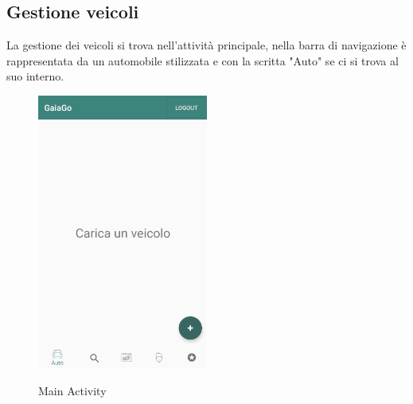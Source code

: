 \subsection{Gestione veicoli}
La gestione dei veicoli si trova nell'attività principale, nella barra di navigazione è rappresentata da un automobile stilizzata e con la scritta "Auto" se ci si trova al suo interno.
 \begin{figure}[H] 
	\centering 
	\includegraphics[width=0.5\textwidth]{res/images/main_activity_vuota.png}\\
	\caption{Main Activity}
	\label{main}
\end{figure}
\pagebreak
